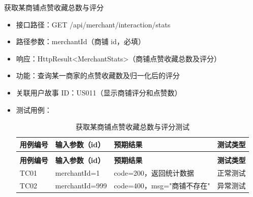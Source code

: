 \begin{levellist}
\begin{levellist}
        \item 获取某商铺点赞收藏总数与评分
        \begin{itemize}
            \item 接口路径：GET /api/merchant/interaction/stats
            \item 路径参数：merchantId（商铺 id，必填）
            \item 响应：HttpResult<MerchantStats>（商铺点赞收藏总数及评分）
            \item 功能：查询某一商家的点赞收藏数及归一化后的评分
            \item 关联用户故事 ID：US011（显示商铺评分和点赞数）
            \item 测试用例：
                  \begin{longtable}{>{\centering\arraybackslash}m{1.7cm} >{\centering\arraybackslash}m{3cm} >{\centering\arraybackslash}m{6.3cm} >{\centering\arraybackslash}m{2cm}}

                      \caption{获取某商铺点赞收藏总数与评分测试} \label{tab:training}                          \\

                      \toprule
                      \textbf{用例编号} & \textbf{输入参数（id）} & \textbf{预期结果}        & \textbf{测试类型} \\
                      \midrule
                      \endfirsthead

                      \multicolumn{4}{c}{{\tablename\ \thetable{} 续表}}                         \\
                      \toprule
                      \textbf{用例编号} & \textbf{输入参数（id）} & \textbf{预期结果}        & \textbf{测试类型} \\
                      \midrule
                      \endhead

                      \bottomrule
                      \endfoot


                      TC01          & merchantId=1      & code=200，返回统计数据      & 正常测试          \\
                      TC02          & merchantId=999    & code=400，msg="商铺不存在" & 异常测试          \\
                  \end{longtable}
        \end{itemize}


\end{levellist}
\end{levellist}
